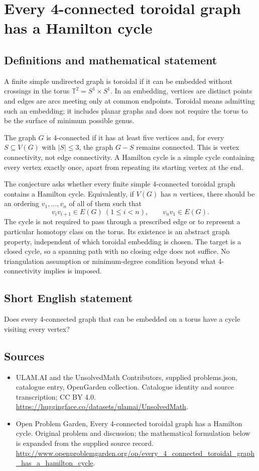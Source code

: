 \documentclass[11pt,a4paper]{article}
\begin{document}
\section*{Every 4-connected toroidal graph has a Hamilton cycle}\label{statement}

\subsection{Definitions and mathematical statement}
A finite simple undirected graph is toroidal if it can be embedded
without crossings in the torus $\mathbb T^2=S^1\times S^1$. In an
embedding, vertices are distinct points and edges are arcs meeting
only at common endpoints. Toroidal means admitting such an embedding;
it includes planar graphs and does not require the torus to be the
surface of minimum possible genus.

The graph $G$ is 4-connected if it has at least five vertices and,
for every $S\subseteq V(G)$ with $|S|\le3$, the graph $G-S$ remains
connected. This is vertex connectivity, not edge connectivity. A
Hamilton cycle is a simple cycle containing every vertex exactly
once, apart from repeating its starting vertex at the end.

The conjecture asks whether every finite simple 4-connected toroidal
graph contains a Hamilton cycle. Equivalently, if $V(G)$ has $n$
vertices, there should be an ordering $v_1,\ldots,v_n$ of all of them
such that
\[
                  v_iv_{i+1}\in E(G)\ (1\le i<n),
                  \qquad v_nv_1\in E(G).
\]
The cycle is not required to pass through a prescribed edge or to
represent a particular homotopy class on the torus. Its existence is
an abstract graph property, independent of which toroidal embedding
is chosen. The target is a closed cycle, so a spanning path with no
closing edge does not suffice. No triangulation assumption or
minimum-degree condition beyond what 4-connectivity implies is imposed.
\subsection{Short English statement}
Does every 4-connected graph that can be embedded on a torus have a cycle visiting every vertex?
\subsection{Sources}
\begin{itemize}
\item[S1] ULAM.AI and the UnsolvedMath Contributors, supplied problems.json, catalogue entry, OpenGarden collection. Catalogue identity and source transcription; CC BY 4.0.
\url{https://huggingface.co/datasets/ulamai/UnsolvedMath}.
\item[S2] Open Problem Garden, Every 4-connected toroidal graph has a Hamilton cycle. Original problem and discussion; the mathematical formulation below is expanded from the supplied source record.
\url{http://www.openproblemgarden.org/op/every_4_connected_toroidal_graph_has_a_hamilton_cycle}.
\end{itemize}
\end{document}
